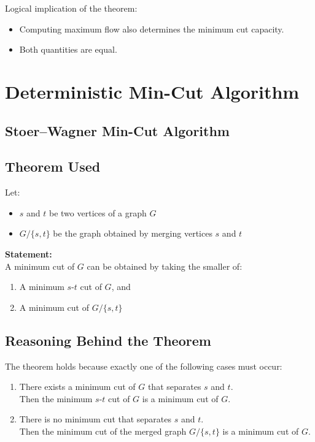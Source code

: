 \documentclass[12pt]{article}
\begin{document}
Logical implication of the theorem:
\begin{itemize}
    \item Computing maximum flow also determines the minimum cut capacity.
    \item Both quantities are equal.
\end{itemize}

\section{Deterministic Min-Cut Algorithm}

\subsection{Stoer–Wagner Min-Cut Algorithm}

\subsection{Theorem Used}

Let:
\begin{itemize}
    \item $s$ and $t$ be two vertices of a graph $G$
    \item $G/\{s,t\}$ be the graph obtained by merging vertices $s$ and $t$
\end{itemize}

\textbf{Statement:} \\
A minimum cut of $G$ can be obtained by taking the smaller of:
\begin{enumerate}
    \item A minimum $s$-$t$ cut of $G$, and
    \item A minimum cut of $G/\{s,t\}$
\end{enumerate}

\subsection{Reasoning Behind the Theorem}

The theorem holds because exactly one of the following cases must occur:

\begin{enumerate}
    \item There exists a minimum cut of $G$ that separates $s$ and $t$. \\
    Then the minimum $s$-$t$ cut of $G$ is a minimum cut of $G$.
    
    \item There is no minimum cut that separates $s$ and $t$. \\
    Then the minimum cut of the merged graph $G/\{s,t\}$ is a minimum cut of $G$.
\end{enumerate}
\end{document}
